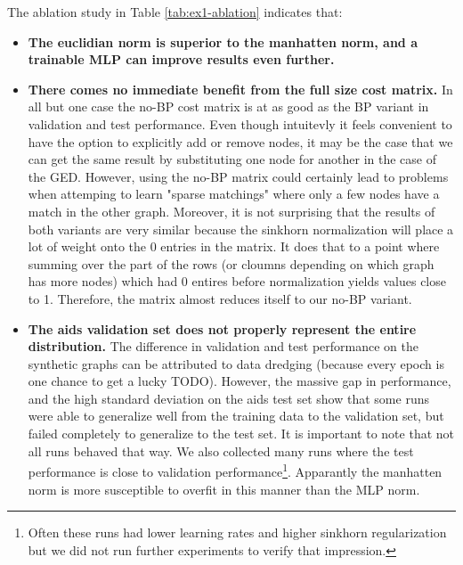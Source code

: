 The ablation study in Table \ref{tab:ex1-ablation} indicates that:
\begin{itemize}
    \itemsep0em
    \item \textbf{The euclidian norm is superior to the manhatten norm, and a trainable MLP can improve results even further.}
    \item \textbf{There comes no immediate benefit from the full size cost matrix.} In all but one case the no-BP cost matrix is at as good as the BP variant in validation and test performance. Even though intuitevly it feels convenient to have the option to explicitly add or remove nodes, it may be the case that we can get the same result by substituting one node for another in the case of the GED. However, using the no-BP matrix could certainly lead to problems when attemping to learn "sparse matchings" where only a few nodes have a match in the other graph. Moreover, it is not surprising that the results of both variants are very similar because the sinkhorn normalization will place a lot of weight onto the 0 entries in the matrix. It does that to a point where summing over the part of the rows (or cloumns depending on which graph has more nodes) which had 0 entires before normalization yields values close to 1. Therefore, the matrix almost reduces itself to our no-BP variant.
    \item \textbf{The aids validation set does not properly represent the entire distribution.} The difference in validation and test performance on the synthetic graphs can be attributed to data dredging (because every epoch is one chance to get a lucky TODO). However, the massive gap in performance, and the high standard deviation on the aids test set show that some runs were able to generalize well from the training data to the validation set, but failed completely to generalize to the test set. It is important to note that not all runs behaved that way. We also collected many runs where the test performance is close to validation performance\footnote{Often these runs had lower learning rates and higher sinkhorn regularization but we did not run further experiments to verify that impression.}. Apparantly the manhatten norm is more susceptible to overfit in this manner than the MLP norm.
\end{itemize}


